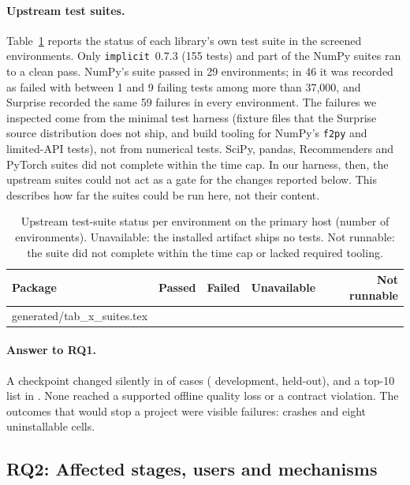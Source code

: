 \documentclass[11pt,a4paper]{article}
\makeatletter
\newcommand{\tablebody}[1]{\@@input generated/#1.tex }
\makeatother
\begin{document}
\paragraph{Upstream test suites.} Table~\ref{tab:suites} reports the status
of each library's own test suite in the screened environments. Only
\texttt{implicit}~0.7.3 (155 tests) and part of the NumPy suites ran to a clean
pass. NumPy's suite passed in 29 environments; in 46 it was recorded as failed
with between 1 and 9 failing tests among more than 37{,}000, and Surprise
recorded the same 59 failures in every environment.
The failures we inspected come from the minimal test harness (fixture files
that the Surprise source distribution does not ship, and build tooling for
NumPy's \texttt{f2py} and limited-API tests), not from numerical tests. SciPy,
pandas, Recommenders and PyTorch suites did not complete within the time cap.
In our harness, then, the upstream suites could not act as a gate for the
changes reported below. This describes how far the suites could be run here,
not their content.

\begin{table}[htbp]
  \centering\small
  \caption{Upstream test-suite status per environment on the primary host
    (number of environments). Unavailable: the installed artifact ships no
    tests. Not runnable: the suite did not complete within the time cap or
    lacked required tooling.}
  \label{tab:suites}
  \begin{tabular}{@{}lrrrr@{}}
    \toprule
    Package & Passed & Failed & Unavailable & Not runnable \\
    \midrule
    \tablebody{tab_x_suites}
    \bottomrule
  \end{tabular}
\end{table}

\paragraph{Answer to RQ1.} A checkpoint changed silently in \nChanged{} of
\nCases{} cases (\nDevChanged{} development, \nHeldoutChanged{} held-out), and
a top-10 list in \nListChanged{}. None reached a supported offline quality loss
or a contract violation. The outcomes that would stop a project were visible
failures: \nFailure{} crashes and eight uninstallable cells.

\subsection{RQ2: Affected stages, users and mechanisms}
\end{document}
